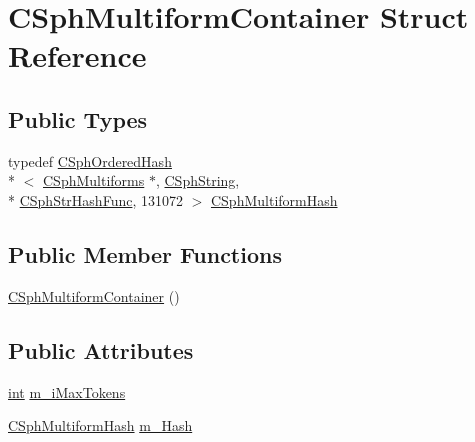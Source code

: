 \hypertarget{structCSphMultiformContainer}{\section{C\-Sph\-Multiform\-Container Struct Reference}
\label{structCSphMultiformContainer}
}
\subsection*{Public Types}
\begin{DoxyCompactItemize}
\item 
typedef \hyperlink{classCSphOrderedHash}{C\-Sph\-Ordered\-Hash}\\*
$<$ \hyperlink{structCSphMultiforms}{C\-Sph\-Multiforms} $\ast$, \hyperlink{structCSphString}{C\-Sph\-String}, \\*
\hyperlink{structCSphStrHashFunc}{C\-Sph\-Str\-Hash\-Func}, 131072 $>$ \hyperlink{structCSphMultiformContainer_a87a9f3a64ecba799463414a63457d060}{C\-Sph\-Multiform\-Hash}
\end{DoxyCompactItemize}
\subsection*{Public Member Functions}
\begin{DoxyCompactItemize}
\item 
\hyperlink{structCSphMultiformContainer_a1253de88aa3d9798dfa733054854865b}{C\-Sph\-Multiform\-Container} ()
\end{DoxyCompactItemize}
\subsection*{Public Attributes}
\begin{DoxyCompactItemize}
\item 
\hyperlink{sphinxexpr_8cpp_a4a26e8f9cb8b736e0c4cbf4d16de985e}{int} \hyperlink{structCSphMultiformContainer_add26576ea112a036f883aa88e5b8e8cd}{m\-\_\-i\-Max\-Tokens}
\item 
\hyperlink{structCSphMultiformContainer_a87a9f3a64ecba799463414a63457d060}{C\-Sph\-Multiform\-Hash} \hyperlink{structCSphMultiformContainer_a14fda72f24a518e5b380946bcf32dcb4}{m\-\_\-\-Hash}
\end{DoxyCompactItemize}


